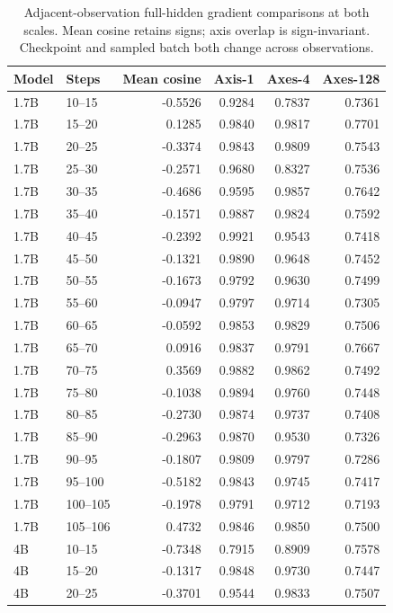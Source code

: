 \begin{table}[!htbp]
\centering
\caption{Adjacent-observation full-hidden gradient comparisons at both scales. Mean cosine retains signs; axis overlap is sign-invariant. Checkpoint and sampled batch both change across observations.}
\label{tab:two_scale_temporal}
\small
\setlength{\tabcolsep}{3pt}
\begin{tabular}{llrrrr}
\toprule
Model & Steps & Mean cosine & Axis-1 & Axes-4 & Axes-128 \\
\midrule
1.7B & 10--15 & -0.5526 & 0.9284 & 0.7837 & 0.7361 \\
1.7B & 15--20 & 0.1285 & 0.9840 & 0.9817 & 0.7701 \\
1.7B & 20--25 & -0.3374 & 0.9843 & 0.9809 & 0.7543 \\
1.7B & 25--30 & -0.2571 & 0.9680 & 0.8327 & 0.7536 \\
1.7B & 30--35 & -0.4686 & 0.9595 & 0.9857 & 0.7642 \\
1.7B & 35--40 & -0.1571 & 0.9887 & 0.9824 & 0.7592 \\
1.7B & 40--45 & -0.2392 & 0.9921 & 0.9543 & 0.7418 \\
1.7B & 45--50 & -0.1321 & 0.9890 & 0.9648 & 0.7452 \\
1.7B & 50--55 & -0.1673 & 0.9792 & 0.9630 & 0.7499 \\
1.7B & 55--60 & -0.0947 & 0.9797 & 0.9714 & 0.7305 \\
1.7B & 60--65 & -0.0592 & 0.9853 & 0.9829 & 0.7506 \\
1.7B & 65--70 & 0.0916 & 0.9837 & 0.9791 & 0.7667 \\
1.7B & 70--75 & 0.3569 & 0.9882 & 0.9862 & 0.7492 \\
1.7B & 75--80 & -0.1038 & 0.9894 & 0.9760 & 0.7448 \\
1.7B & 80--85 & -0.2730 & 0.9874 & 0.9737 & 0.7408 \\
1.7B & 85--90 & -0.2963 & 0.9870 & 0.9530 & 0.7326 \\
1.7B & 90--95 & -0.1807 & 0.9809 & 0.9797 & 0.7286 \\
1.7B & 95--100 & -0.5182 & 0.9843 & 0.9745 & 0.7417 \\
1.7B & 100--105 & -0.1978 & 0.9791 & 0.9712 & 0.7193 \\
1.7B & 105--106 & 0.4732 & 0.9846 & 0.9850 & 0.7500 \\
4B & 10--15 & -0.7348 & 0.7915 & 0.8909 & 0.7578 \\
4B & 15--20 & -0.1317 & 0.9848 & 0.9730 & 0.7447 \\
4B & 20--25 & -0.3701 & 0.9544 & 0.9833 & 0.7507 \\

\end{tabular}
\end{table}
